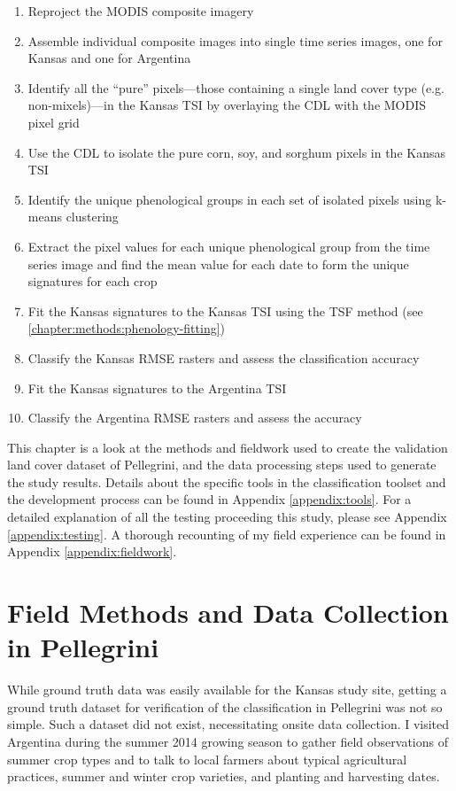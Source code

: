 \begin{Spacing}{1.2}
\begin{enumerate}
  \item Reproject the MODIS composite imagery
  \item Assemble individual composite images into single time series images, one for Kansas and one for Argentina
  \item Identify all the ``pure'' pixels---those containing a single land cover type (e.g. non-mixels)---in the Kansas TSI by overlaying the CDL with the MODIS pixel grid
  \item Use the CDL to isolate the pure corn, soy, and sorghum pixels in the Kansas TSI
  \item Identify the unique phenological groups in each set of isolated pixels using k-means clustering
  \item Extract the pixel values for each unique phenological group from the time series image and find the mean value for each date to form the unique signatures for each crop
  \item Fit the Kansas signatures to the Kansas TSI using the TSF method (see \autoref{chapter:methods:phenology-fitting})
  \item Classify the Kansas RMSE rasters and assess the classification accuracy
  \item Fit the Kansas signatures to the Argentina TSI
  \item Classify the Argentina RMSE rasters and assess the accuracy
\end{enumerate}
\end{Spacing}

This chapter is a look at the methods and fieldwork used to create the validation land cover dataset of Pellegrini, and the data processing steps used to generate the study results. Details about the specific tools in the classification toolset and the development process can be found in Appendix \ref{appendix:tools}. For a detailed explanation of all the testing proceeding this study, please see Appendix \ref{appendix:testing}. A thorough recounting of my field experience can be found in Appendix \ref{appendix:fieldwork}.


\section{Field Methods and Data Collection in Pellegrini}

While ground truth data was easily available for the Kansas study site, getting a ground truth dataset for verification of the classification in Pellegrini was not so simple. Such a dataset did not exist, necessitating onsite data collection. I visited Argentina during the summer 2014 growing season to gather field observations of summer crop types and to talk to local farmers about typical agricultural practices, summer and winter crop varieties, and planting and harvesting dates.

